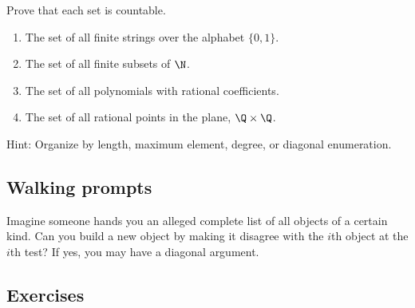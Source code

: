\begin{labbox}
Prove that each set is countable.

\begin{enumerate}
\item The set of all finite strings over the alphabet $\{0,1\}$.
\item The set of all finite subsets of $\N$.
\item The set of all polynomials with rational coefficients.
\item The set of all rational points in the plane, $\Q\times\Q$.
\end{enumerate}

Hint: Organize by length, maximum element, degree, or diagonal enumeration.
\end{labbox}

\subsection{Walking prompts}

\begin{walkbox}
Imagine someone hands you an alleged complete list of all objects of a certain kind. Can you build a new object by making it disagree with the $i$th object at the $i$th test? If yes, you may have a diagonal argument.
\end{walkbox}

\subsection{Exercises}

